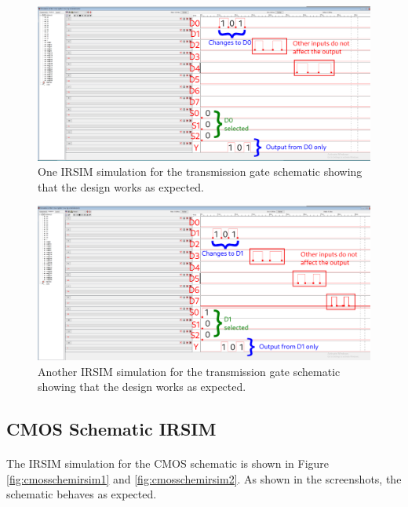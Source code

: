 \documentclass{article}
\begin{document}
    \begin{figure}[H]
      \centering
      \includegraphics[width=\linewidth, frame]{screenshots/tg/schem/irsim.png}
      \caption{One IRSIM simulation for the transmission gate schematic showing that the design works as expected.}
      \label{fig:tgschemirsim1}
    \end{figure}


    \begin{figure}[H]
      \centering
      \includegraphics[width=\linewidth, frame]{screenshots/tg/schem/irsim2.png}
      \caption{Another IRSIM simulation for the transmission gate schematic showing that the design works as expected.}
      \label{fig:tgschemirsim2}
    \end{figure}


  \subsection{CMOS Schematic IRSIM}
    \paragraph{}
    The IRSIM simulation for the CMOS schematic is shown in Figure \ref{fig:cmosschemirsim1} and \ref{fig:cmosschemirsim2}. As shown in the screenshots, the schematic behaves as expected.
\end{document}
